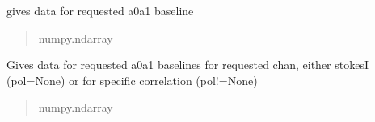 \documentclass[letterpaper,10pt,english]{sphinxmanual}
\begin{document}
\begin{fulllineitems}

\begin{fulllineitems}
\label{\detokenize{api/killMS.Data:killMS.Data.ClassMS.ClassMS.GiveVisBL}}
\pysigstartsignatures
{}
\pysigstopsignatures
\sphinxAtStartPar
gives data for requested a0\sphinxhyphen{}a1 baseline
\begin{quote}\begin{description}
\sphinxAtStartPar
numpy.ndarray

\end{description}\end{quote}

\end{fulllineitems}


\begin{fulllineitems}
\label{\detokenize{api/killMS.Data:killMS.Data.ClassMS.ClassMS.GiveVisBLChan}}
\pysigstartsignatures
{}
\pysigstopsignatures
\sphinxAtStartPar
Gives data for requested a0\sphinxhyphen{}a1 baselines for requested chan, either stokes\sphinxhyphen{}I (pol=None) or for specific correlation (pol!=None)
\begin{quote}\begin{description}
\sphinxAtStartPar
numpy.ndarray

\end{description}\end{quote}

\end{fulllineitems}



\end{fulllineitems}
\end{document}

